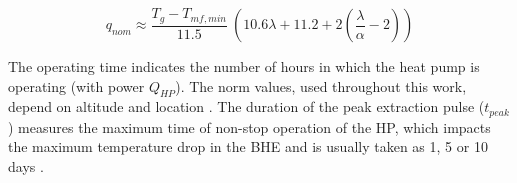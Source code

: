 \begin{equation}
\label{eq:q_nom}
    q_{nom} \approx \frac{T_g - T_\mathit{mf, min}}{11.5} \ \left( 10.6 \lambda + 11.2 + 2 \left( \frac{\lambda}{\alpha} - 2 \right) \right)
\end{equation}

The operating time indicates the number of hours in which the heat pump is operating (with power $Q_{HP}$). The norm values, used throughout this work, depend on altitude and location \cite{sia_sondes_2010}.
The duration of the peak extraction pulse ($t_\mathit{peak}$) measures the maximum time of non-stop operation of the HP, which impacts the maximum temperature drop in the BHE and is usually taken as 1, 5 or 10 days \cite{pahud_geothermal_2002}.

